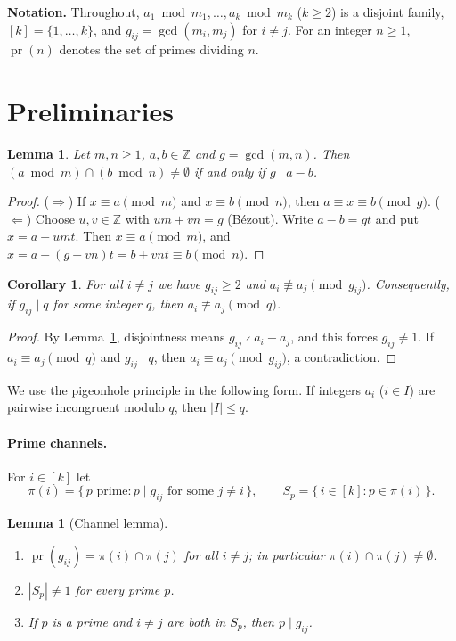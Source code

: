 \documentclass[11pt]{article}
\newtheorem{lemma}[theorem]{Lemma}
\newtheorem{corollary}[theorem]{Corollary}
\theoremstyle{remark}
\theoremstyle{definition}
\newcommand{\pr}{\operatorname{pr}}
\begin{document}
\medskip\noindent\textbf{Notation.} Throughout, $a_1\bmod m_1,\dots,a_k\bmod m_k$ ($k\ge2$) is a
disjoint family, $[k]=\{1,\dots,k\}$, and $g_{ij}=\gcd(m_i,m_j)$ for $i\ne j$. For an integer
$n\ge 1$, $\pr(n)$ denotes the set of primes dividing $n$.

\section{Preliminaries}

\begin{lemma}\label{lem:crt}
Let $m,n\ge1$, $a,b\in\mathbb{Z}$ and $g=\gcd(m,n)$. Then $(a\bmod m)\cap(b\bmod n)\ne\emptyset$ if
and only if $g\mid a-b$.
\end{lemma}

\begin{proof}
($\Rightarrow$) If $x\equiv a\pmod m$ and $x\equiv b\pmod n$, then $a\equiv x\equiv b\pmod g$.
($\Leftarrow$) Choose $u,v\in\mathbb{Z}$ with $um+vn=g$ (B\'ezout). Write $a-b=gt$ and put
$x=a-umt$. Then $x\equiv a\pmod m$, and $x=a-(g-vn)t=b+vnt\equiv b\pmod n$.
\end{proof}

\begin{corollary}\label{cor:basic}
For all $i\ne j$ we have $g_{ij}\ge2$ and $a_i\not\equiv a_j\pmod{g_{ij}}$. Consequently, if
$g_{ij}\mid q$ for some integer $q$, then $a_i\not\equiv a_j\pmod q$.
\end{corollary}

\begin{proof}
By Lemma~\ref{lem:crt}, disjointness means $g_{ij}\nmid a_i-a_j$, and this forces $g_{ij}\ne1$.
If $a_i\equiv a_j\pmod q$ and $g_{ij}\mid q$, then $a_i\equiv a_j\pmod{g_{ij}}$, a contradiction.
\end{proof}

We use the pigeonhole principle in the following form. If integers $a_i$ ($i\in I$) are
pairwise incongruent modulo $q$, then $|I|\le q$.

\paragraph{Prime channels.}
For $i\in[k]$ let
\[
  \pi(i)=\{\,p \text{ prime}: p\mid g_{ij}\text{ for some } j\ne i\,\},
  \qquad S_p=\{\,i\in[k]: p\in\pi(i)\,\}.
\]

\begin{lemma}[Channel lemma]\label{lem:channel}
\begin{enumerate}
\item[(a)] $\pr(g_{ij})=\pi(i)\cap\pi(j)$ for all $i\ne j$; in particular $\pi(i)\cap\pi(j)\ne\emptyset$.
\item[(b)] $|S_p|\ne1$ for every prime $p$.
\item[(c)] If $p$ is a prime and $i\ne j$ are both in $S_p$, then $p\mid g_{ij}$.
\end{enumerate}
\end{lemma}
\end{document}
